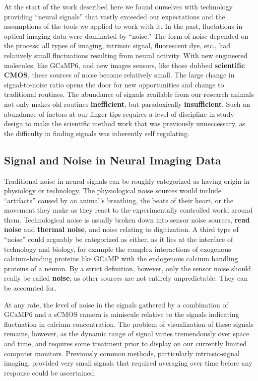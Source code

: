 \documentclass[
  12pt,
]{report}
\numberwithin{figure}{section}
\numberwithin{table}{section}
\numberwithin{equations}{section}
\begin{document}
At the start of the work described here we found ourselves with
technology providing ``neural signals'' that vastly exceeded our
expectations and the assumptions of the tools we applied to work with
it. In the past, fluctations in optical imaging data were dominated by
``noise.'' The form of noise depended on the process; all types of
imaging, intrinsic signal, fluorescent dye, etc., had relatively small
fluctuations resulting from neural activity. With new engineered
molecules, like GCaMP6, and new images sensors, like those dubbed
\textbf{scientific CMOS}, these sources of noise become relatively
small. The large change in signal-to-noise ratio opens the door for new
opportunities and change to traditional routines. The abundance of
signals available from our research animals not only makes old routines
\textbf{inefficient}, but paradoxically \textbf{insufficient}. Such an
abundance of factors at our finger tips requires a level of discipline
in study design to make the scientific method work that was previously
unneccessary, as the difficulty in finding signals was inherently self
regulating.

\hypertarget{signal-and-noise-in-neural-imaging-data}{%
\subsection{Signal and Noise in Neural Imaging
Data}\label{signal-and-noise-in-neural-imaging-data}}

Traditional noise in neural signals can be roughly categorized as having
origin in physiology or technology. The physiological noise sources
would include ``artifacts'' caused by an animal's breathing, the beats
of their heart, or the movement they make as they react to the
experimentally controlled world around them. Technological noise is
usually broken down into sensor noise sources, \textbf{read noise} and
\textbf{thermal noise}, and noise relating to digitization. A third type
of ``noise'' could arguably be categorized as either, as it lies at the
interface of technology and biology, for example the complex
interactions of exogenous calcium-binding proteins like GCaMP with the
endogenous calcium handling proteins of a neuron. By a strict
definition, however, only the sensor noise should really be called
\textbf{noise}, as other sources are not entirely unpredictable. They
can be accounted for.

At any rate, the level of noise in the signals gathered by a combination
of GCaMP6 and a sCMOS camera is miniscule relative to the signals
indicating fluctuation in calcium concentration. The problem of
visualization of these signals remains, however, as the dynamic range of
signal varies tremendously over space and time, and requires some
treatment prior to display on our currently limited computer monitors.
Previously common methods, particularly intrinsic-signal imaging,
provided very small signals that required averaging over time before any
response could be ascertained.
\end{document}

